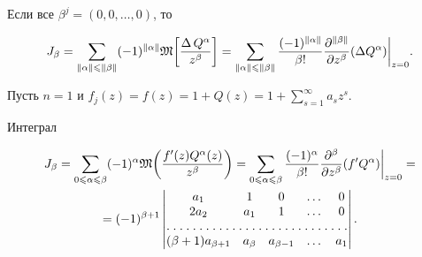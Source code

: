 \begin{cor}\label{c1}


Если все $\beta^j=(0,0,\dotsc,0)$, то


$$


J_\beta=\sum_{\|\alpha\|\leqslant\|\beta\|}(-1)^{\|\alpha\|}\frak{M}


\bigg[\frac{\Delta \, Q^\alpha}{z^\beta}\bigg]=


\sum_{\|\alpha\|\leqslant\|\beta\|}\frac{(-1)^{\|\alpha\|}}{\beta!}


\frac{\partial^{\|\beta\|}}{\partial z^\beta}(\Delta Q^\alpha)


\bigg|_{z=0}.


$$


\end{cor}





Пусть $n=1$ и $f_j(z)=f(z)=1+Q(z)=1+\sum\limits_{s=1}^\infty a_sz^s$.








\begin{cor}\label{c2} Интеграл


\begin{multline*}


J_\beta=\sum_{0\leqslant\alpha\leqslant\beta}(-1)^\alpha\frak


M\bigg(\frac{f'(z)Q^\alpha(z)}{


z^\beta}\bigg)=\sum_{0\leqslant\alpha\leqslant\beta}\frac{(-1)^\alpha}{


\beta!}\frac{\partial^\beta}{\partial z^\beta}(f'Q^\alpha)\bigg|_{z=0}= \\


%


=(-1)^{\beta+1}\begin{vmatrix} a_1 & 1 & 0 & \dotsc & 0\\


2a_2 & a_1 & 1 & \dotsc & 0\\ \hdotsfor[1.5]{5} \\


(\beta+1)a_{\beta+1} & a_\beta & a_{\beta-1} & \dotsc & a_1\end{vmatrix}.


\end{multline*}


\end{cor}





